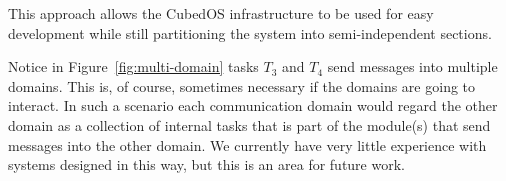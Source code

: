 This approach allows the CubedOS infrastructure to be used for easy development while still
partitioning the system into semi-independent sections.

Notice in Figure~\ref{fig:multi-domain} tasks $T_3$ and $T_4$ send messages into multiple
domains. This is, of course, sometimes necessary if the domains are going to interact. In such a
scenario each communication domain would regard the other domain as a collection of internal
tasks that is part of the module(s) that send messages into the other domain. We currently have
very little experience with systems designed in this way, but this is an area for future work.
